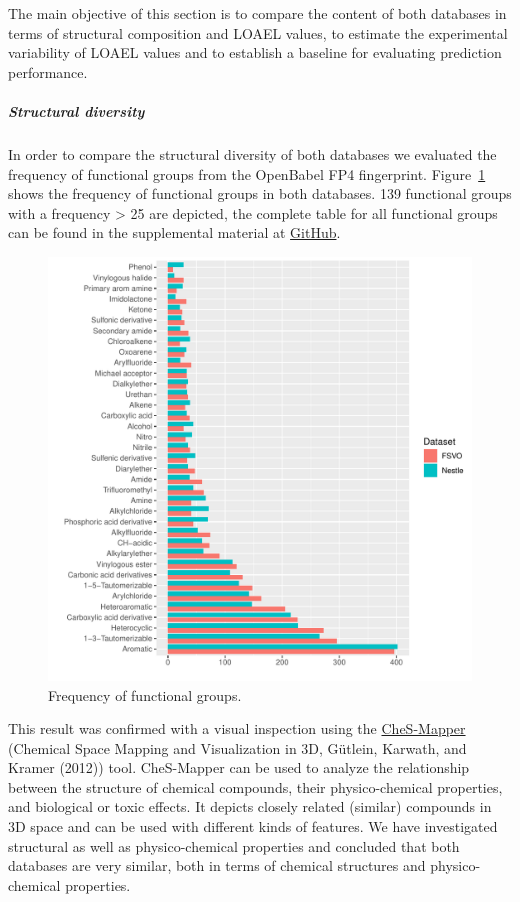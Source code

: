 \documentclass[]{achemso}
\let\oldsubparagraph\subparagraph
\renewcommand{\subparagraph}[1]{\oldsubparagraph{#1}\mbox{}}
\begin{document}
The main objective of this section is to compare the content of both
databases in terms of structural composition and LOAEL values, to
estimate the experimental variability of LOAEL values and to establish a
baseline for evaluating prediction performance.

\subparagraph{Structural diversity}\label{structural-diversity}

In order to compare the structural diversity of both databases we
evaluated the frequency of functional groups from the OpenBabel FP4
fingerprint. Figure~\ref{fig:fg} shows the frequency of functional
groups in both databases. 139 functional groups with a frequency
\textgreater{} 25 are depicted, the complete table for all functional
groups can be found in the supplemental material at
\href{https://github.com/opentox/loael-paper/blob/submission/data/functional-groups.csv}{GitHub}.

\begin{figure}
\centering
\includegraphics{figures/functional-groups.pdf}
\caption{Frequency of functional groups.}\label{fig:fg}
\end{figure}

This result was confirmed with a visual inspection using the
\href{http://ches-mapper.org}{CheS-Mapper} (Chemical Space Mapping and
Visualization in 3D, Gütlein, Karwath, and Kramer (2012)) tool.
CheS-Mapper can be used to analyze the relationship between the
structure of chemical compounds, their physico-chemical properties, and
biological or toxic effects. It depicts closely related (similar)
compounds in 3D space and can be used with different kinds of features.
We have investigated structural as well as physico-chemical properties
and concluded that both databases are very similar, both in terms of
chemical structures and physico-chemical properties.
\end{document}
